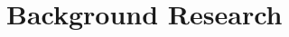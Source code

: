 \documentclass{article}
\begin{document}
\section{Background Research}

\subsection{}
\end{document}

